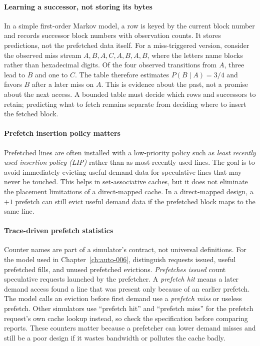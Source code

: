 \paragraph{Learning a successor, not storing its bytes}
In a simple first-order Markov model, a row is keyed by the current block number and records successor block numbers with observation counts.
It stores predictions, not the prefetched data itself.
For a miss-triggered version, consider the observed miss stream $A,B,A,C,A,B,A,B$, where the letters name blocks rather than hexadecimal digits.
Of the four observed transitions from $A$, three lead to $B$ and one to $C$.
The table therefore estimates $P(B\mid A)=3/4$ and favors $B$ after a later miss on $A$.
This is evidence about the past, not a promise about the next access.
A bounded table must decide which rows and successors to retain; predicting what to fetch remains separate from deciding where to insert the fetched block.

\paragraph{Prefetch insertion policy matters}\label{par:auto-021e}
Prefetched lines are often installed with a low-priority policy such as \textit{least recently used insertion policy (LIP)} rather than as most-recently used lines.
The goal is to avoid immediately evicting useful demand data for speculative lines that may never be touched.
This helps in set-associative caches, but it does not eliminate the placement limitations of a direct-mapped cache.
In a direct-mapped design, a $+1$ prefetch can still evict useful demand data if the prefetched block maps to the same line.

\paragraph{Trace-driven prefetch statistics}\label{par:auto-021c}
Counter names are part of a simulator's contract, not universal definitions.
For the model used in Chapter~\ref{ch:auto-006}, distinguish requests issued, useful prefetched fills, and unused prefetched evictions.
\textit{Prefetches issued} count speculative requests launched by the prefetcher.
A \textit{prefetch hit} means a later demand access found a line that was present only because of an earlier prefetch.
The model calls an eviction before first demand use a \textit{prefetch miss} or useless prefetch.
Other simulators use ``prefetch hit'' and ``prefetch miss'' for the prefetch request's own cache lookup instead, so check the specification before comparing reports.
These counters matter because a prefetcher can lower demand misses and still be a poor design if it wastes bandwidth or pollutes the cache badly.


